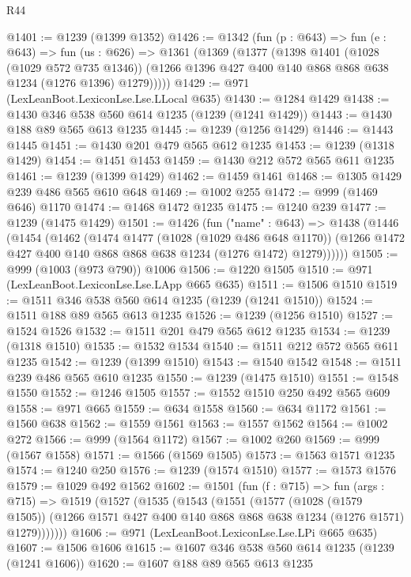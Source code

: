\begin{lexlean}{R44}
\begin{coremodule}
@1401 := @1239 (@1399 @1352)
@1426 := @1342
    (fun (p : @643) =>
    fun (e : @643) =>
    fun (us : @626) =>
    @1361
      (@1369
        (@1377
          (@1398
            @1401
            (@1028 (@1029 @572 @735 @1346))
            (@1266 @1396 @427 @400 @140 @868 @868 @638 @1234 (@1276 @1396) @1279)))))
@1429 := @971 (LexLeanBoot.LexiconLse.Lse.LLocal @635)
@1430 := @1284 @1429
@1438 := @1430 @346 @538 @560 @614 @1235 (@1239 (@1241 @1429))
@1443 := @1430 @188 @89 @565 @613 @1235
@1445 := @1239 (@1256 @1429)
@1446 := @1443 @1445
@1451 := @1430 @201 @479 @565 @612 @1235
@1453 := @1239 (@1318 @1429)
@1454 := @1451 @1453
@1459 := @1430 @212 @572 @565 @611 @1235
@1461 := @1239 (@1399 @1429)
@1462 := @1459 @1461
@1468 := @1305 @1429 @239 @486 @565 @610 @648
@1469 := @1002 @255
@1472 := @999 (@1469 @646) @1170
@1474 := @1468 @1472 @1235
@1475 := @1240 @239
@1477 := @1239 (@1475 @1429)
@1501 := @1426
    (fun ("name" : @643) =>
    @1438
      (@1446
        (@1454
          (@1462
            (@1474
              @1477
              (@1028 (@1029 @486 @648 @1170))
              (@1266 @1472 @427 @400 @140 @868 @868 @638 @1234 (@1276 @1472) @1279))))))
@1505 := @999 (@1003 (@973 @790)) @1006
@1506 := @1220 @1505
@1510 := @971 (LexLeanBoot.LexiconLse.Lse.LApp @665 @635)
@1511 := @1506 @1510
@1519 := @1511 @346 @538 @560 @614 @1235 (@1239 (@1241 @1510))
@1524 := @1511 @188 @89 @565 @613 @1235
@1526 := @1239 (@1256 @1510)
@1527 := @1524 @1526
@1532 := @1511 @201 @479 @565 @612 @1235
@1534 := @1239 (@1318 @1510)
@1535 := @1532 @1534
@1540 := @1511 @212 @572 @565 @611 @1235
@1542 := @1239 (@1399 @1510)
@1543 := @1540 @1542
@1548 := @1511 @239 @486 @565 @610 @1235
@1550 := @1239 (@1475 @1510)
@1551 := @1548 @1550
@1552 := @1246 @1505
@1557 := @1552 @1510 @250 @492 @565 @609
@1558 := @971 @665
@1559 := @634 @1558
@1560 := @634 @1172
@1561 := @1560 @638
@1562 := @1559 @1561
@1563 := @1557 @1562
@1564 := @1002 @272
@1566 := @999 (@1564 @1172)
@1567 := @1002 @260
@1569 := @999 (@1567 @1558)
@1571 := @1566 (@1569 @1505)
@1573 := @1563 @1571 @1235
@1574 := @1240 @250
@1576 := @1239 (@1574 @1510)
@1577 := @1573 @1576
@1579 := @1029 @492 @1562
@1602 := @1501
    (fun (f : @715) =>
    fun (args : @715) =>
    @1519
      (@1527
        (@1535
          (@1543
            (@1551
              (@1577
                (@1028 (@1579 @1505))
                (@1266 @1571 @427 @400 @140 @868 @868 @638 @1234 (@1276 @1571) @1279)))))))
@1606 := @971 (LexLeanBoot.LexiconLse.Lse.LPi @665 @635)
@1607 := @1506 @1606
@1615 := @1607 @346 @538 @560 @614 @1235 (@1239 (@1241 @1606))
@1620 := @1607 @188 @89 @565 @613 @1235

\end{coremodule}
\end{lexlean}

